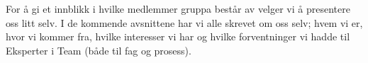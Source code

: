 For å gi et innblikk i hvilke medlemmer gruppa består av velger vi å presentere oss litt selv.
I de kommende avsnittene har vi alle skrevet om oss selv; hvem vi er, hvor vi kommer fra, hvilke interesser vi har og hvilke forventninger vi hadde til Eksperter i Team (både til fag og prosess).